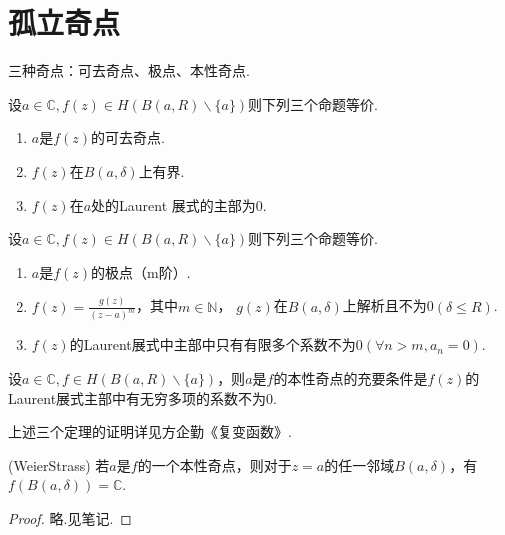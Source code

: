 \section{孤立奇点}
三种奇点：可去奇点、极点、本性奇点.
\begin{mypro}
	设$\displaystyle{a \in \mathbb{C}, f(z) \in H(B(a, R) \backslash \{ a\})}$则下列三个命题等价.
	\begin{enumerate} [(1)]
		\item $\displaystyle{a}$是$\displaystyle{f(z)}$的可去奇点.
		\item $\displaystyle{f(z)}$在$\displaystyle{B(a, \delta)}$上有界.
		\item $\displaystyle{f(z)}$在$\displaystyle{a}$处的{\rm Laurent} 展式的主部为0.
	\end{enumerate}
\end{mypro}

\begin{mypro}
	设$\displaystyle{a \in \mathbb{C}, f(z) \in H(B(a, R) \backslash \{ a\})}$则下列三个命题等价.
	\begin{enumerate} [(1)]
		\item $\displaystyle{a}$是$\displaystyle{f(z)}$的极点（m阶）.
		\item $\displaystyle{f(z) = \frac{g(z)}{(z - a) ^ m}}$，其中$\displaystyle{m \in \mathbb{N}}$， $\displaystyle{g(z)}$在$\displaystyle{B(a, \delta)}$上解析且不为0$\displaystyle{(\delta \leq R)}$.
		\item $\displaystyle{f(z)}$的{\rm Laurent}展式中主部中只有有限多个系数不为0$\displaystyle{(\forall n > m, a_n = 0)}$.
		
	\end{enumerate}
\end{mypro}

\begin{mypro}
	设$\displaystyle{a \in \mathbb{C}, f \in H(B(a, R) \backslash \{a\})}$，则$\displaystyle{a}$是$\displaystyle{f}$的本性奇点的充要条件是$\displaystyle{f(z)}$的{\rm Laurent}展式主部中有无穷多项的系数不为0.
\end{mypro}
上述三个定理的证明详见方企勤《复变函数》.

\begin{mypro}
	\color{blue}
	(WeierStrass)
	\color{black}
	若$\displaystyle{a}$是$\displaystyle{f}$的一个本性奇点，则对于$\displaystyle{z=a}$的任一邻域$\displaystyle{B(a, \delta)}$，有$\displaystyle{f(B(a, \delta)) = \mathbb{C}}$.
\end{mypro}
\begin{proof}
	略.见笔记.
\end{proof}

